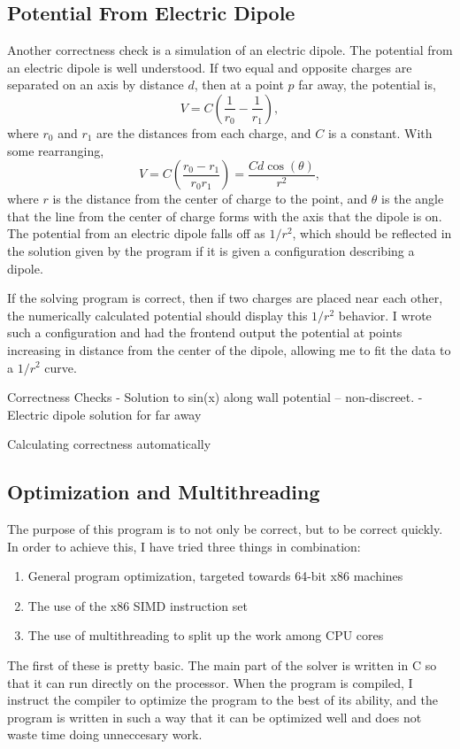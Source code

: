\subsection{Potential From Electric Dipole}
Another correctness check is a simulation of an electric dipole. The potential from an electric dipole is well understood.
If two equal and opposite charges are separated on an axis by distance $d$, then at a point $p$ far away, the
potential is,
$$V = C\left(\frac{1}{r_0} - \frac{1}{r_1}\right),$$
where $r_0$ and $r_1$ are the distances from each charge, and $C$ is a constant. With some rearranging,
$$V = C\left(\frac{r_0 - r_1}{r_0 r_1}\right) = \frac{C d \cos(\theta)}{r^2},$$
where $r$ is the distance from the center of charge to the point, and $\theta$ is the angle that the line from the
center of charge forms with the axis that the dipole is on. The potential from an electric dipole falls off as $1/r^2$,
which should be reflected in the solution given by the program if it is given a configuration describing a dipole.

If the solving program is correct, then if two charges are placed near each other, the numerically calculated potential
should display this $1/r^2$ behavior. I wrote such a configuration and had the frontend output the potential at points
increasing in distance from the center of the dipole, allowing me to fit the data to a $1/r^2$ curve.


Correctness Checks
 - Solution to sin(x) along wall potential -- non-discreet.
 - Electric dipole solution for far away

Calculating correctness automatically

\subsection{Optimization and Multithreading}
The purpose of this program is to not only be correct, but to be correct quickly. In order to achieve this, I have
tried three things in combination:
\begin{enumerate}
\item General program optimization, targeted towards 64-bit x86 machines
\item The use of the x86 SIMD instruction set
\item The use of multithreading to split up the work among CPU cores
\end{enumerate}
The first of these is pretty basic. The main part of the solver is written in C so that it can run directly on the
processor. When the program is compiled, I instruct the compiler to optimize the program to the best of its ability,
and the program is written in such a way that it can be optimized well and does not waste time doing unneccesary work.

